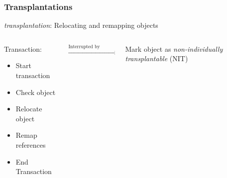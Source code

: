 \documentclass{beamer}
\newcommand{\linespace}{\vskip 0.25cm}
\begin{document}
\begin{frame}

\frametitle{Transplantations}

\emph{transplantation}: Relocating and remapping objects

\linespace
\linespace

\begin{columns}
\begin{column}{0.33\textwidth}

Transaction:
\begin{itemize}
\item Start transaction
\item Check object
\item Relocate object
\item Remap references
\item End Transaction
\end{itemize}

\end{column}
\begin{column}{0.32\textwidth}

$\xrightarrow{\text{Interrupted by application}}$

\end{column}
\begin{column}{0.3\textwidth}

Mark object as \emph{non-individually transplantable} (NIT)

\end{column}
\end{columns}

\end{frame}
\end{document}
